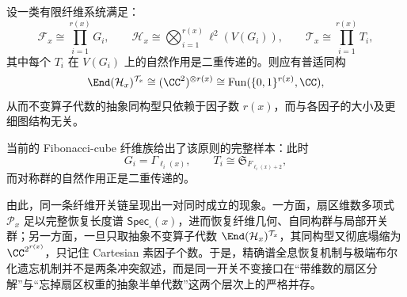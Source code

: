 \begin{conjecture}[二重传递局部开关群的普适布尔塌缩]\label{conj:conclusion-fiber-toggle-2transitive-boolean-collapse}
设一类有限纤维系统满足：
\[
\mathcal F_x\cong \prod_{i=1}^{r(x)} G_i,
\qquad
\mathcal H_x\cong \bigotimes_{i=1}^{r(x)}\ell^2(V(G_i)),
\qquad
\mathcal T_x\cong \prod_{i=1}^{r(x)}T_i,
\]
其中每个 \(T_i\) 在 \(V(G_i)\) 上的自然作用是二重传递的。则应有普适同构
\[
\End(\mathcal H_x)^{\mathcal T_x}
\cong
(\CC^2)^{\otimes r(x)}
\cong
\mathrm{Fun}(\{0,1\}^{r(x)},\CC),
\]
从而不变算子代数的抽象同构型只依赖于因子数 \(r(x)\)，而与各因子的大小及更细图结构无关。

当前的 Fibonacci-cube 纤维族给出了该原则的完整样本：此时
\[
G_i=\Gamma_{\ell_i(x)},
\qquad
T_i\cong \mathfrak S_{F_{\ell_i(x)+2}},
\]
而对称群的自然作用正是二重传递的。
\end{conjecture}

\noindent
由此，同一条纤维开关链呈现出一对同时成立的现象。一方面，扇区维数多项式 \(\mathscr P_x\) 足以完整恢复长度谱 \(\mathsf{Spec}_{\square}(x)\)，进而恢复纤维几何、自同构群与局部开关群；另一方面，一旦只取抽象不变算子代数 \(\End(\mathcal H_x)^{\mathcal T_x}\)，其同构型又彻底塌缩为 \(\CC^{2^{r(x)}}\)，只记住 Cartesian 素因子个数。于是，精确谱全息恢复机制与极端布尔化遗忘机制并不是两条冲突叙述，而是同一开关不变接口在“带维数的扇区分解”与“忘掉扇区权重的抽象半单代数”这两个层次上的严格并存。

\endinput
